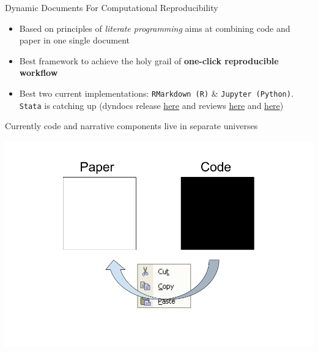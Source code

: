 \documentclass[ignorenonframetext,]{beamer}
\providecommand{\tightlist}{%
  \setlength{\itemsep}{0pt}\setlength{\parskip}{0pt}}
\begin{document}
\begin{frame}[fragile]{Dynamic Documents For Computational
Reproducibility}
\protect\hypertarget{dynamic-documents-for-computational-reproducibility}{}

\begin{itemize}
\tightlist
\item
  Based on principles of \emph{literate programming} aims at combining
  code and paper in one single document
\item
  Best framework to achieve the holy grail of \textbf{one-click
  reproducible workflow}
\item
  Best two current implementations: \texttt{RMarkdown\ (R)} \&
  \texttt{Jupyter\ (Python)}. \texttt{Stata} is catching up (dyndocs
  release \href{https://www.stata.com/new-in-stata/markdown/}{here} and
  reviews
  \href{http://data.princeton.edu/stata/markdown/markstat.htm}{here} and
  \href{https://www.bitss.org/2017/09/05/review-of-statas-dyndoc/}{here})
\end{itemize}

\end{frame}

\begin{frame}{Currently code and narrative components live in separate
universes}
\protect\hypertarget{currently-code-and-narrative-components-live-in-separate-universes}{}

\includegraphics{./Two universes.png}

\end{frame}
\end{document}
